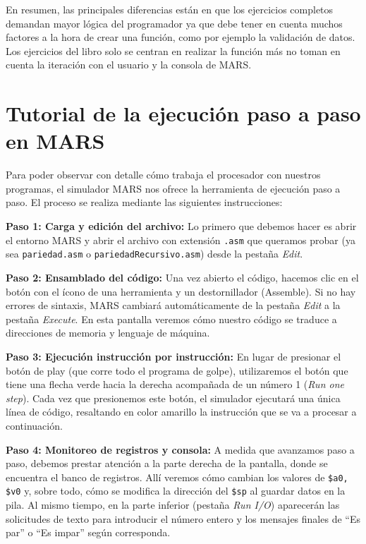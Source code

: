 \documentclass[12pt, a4paper]{article}
\begin{document}
En resumen, las principales diferencias están en que los ejercicios completos demandan mayor lógica del programador ya que debe tener en cuenta muchos factores a la hora de crear una función, como por ejemplo la validación de datos. Los ejercicios del libro solo se centran en realizar la función más no toman en cuenta la iteración con el usuario y la consola de MARS.

\section{Tutorial de la ejecución paso a paso en MARS}

Para poder observar con detalle cómo trabaja el procesador con nuestros programas, el simulador MARS nos ofrece la herramienta de ejecución paso a paso. El proceso se realiza mediante las siguientes instrucciones:

{\large\textbf{Paso 1: Carga y edición del archivo:}} Lo primero que debemos hacer es abrir el entorno MARS y abrir el archivo con extensión \lstinline|.asm| que queramos probar (ya sea \lstinline|pariedad.asm| o \lstinline|pariedadRecursivo.asm|) desde la pestaña \textit{Edit}.

{\large\textbf{Paso 2: Ensamblado del código:}} Una vez abierto el código, hacemos clic en el botón con el ícono de una herramienta y un destornillador (Assemble). Si no hay errores de sintaxis, MARS cambiará automáticamente de la pestaña \textit{Edit} a la pestaña \textit{Execute}. En esta pantalla veremos cómo nuestro código se traduce a direcciones de memoria y lenguaje de máquina.

{\large\textbf{Paso 3: Ejecución instrucción por instrucción:}} En lugar de presionar el botón de play (que corre todo el programa de golpe), utilizaremos el botón que tiene una flecha verde hacia la derecha acompañada de un número 1 (\textit{Run one step}). Cada vez que presionemos este botón, el simulador ejecutará una única línea de código, resaltando en color amarillo la instrucción que se va a procesar a continuación.

{\large\textbf{Paso 4: Monitoreo de registros y consola:}} A medida que avanzamos paso a paso, debemos prestar atención a la parte derecha de la pantalla, donde se encuentra el banco de registros. Allí veremos cómo cambian los valores de \lstinline|$a0, $v0| y, sobre todo, cómo se modifica la dirección del \lstinline|$sp| al guardar datos en la pila. Al mismo tiempo, en la parte inferior (pestaña \textit{Run I/O}) aparecerán las solicitudes de texto para introducir el número entero y los mensajes finales de ``Es par'' o ``Es impar'' según corresponda.
\end{document}
